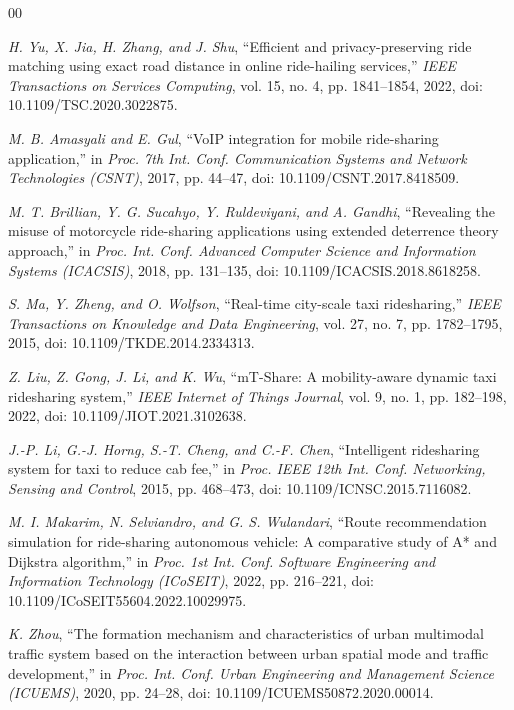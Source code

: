 \documentclass[conference]{IEEEtran}
\begin{document}
\begin{thebibliography}{00}

 \textit{H. Yu, X. Jia, H. Zhang, and J. Shu}, “Efficient and privacy-preserving ride matching using exact road distance in online ride-hailing services,” \textit{IEEE Transactions on Services Computing}, vol. 15, no. 4, pp. 1841–1854, 2022, doi: 10.1109/TSC.2020.3022875.

 \textit{M. B. Amasyali and E. Gul}, “VoIP integration for mobile ride-sharing application,” in \textit{Proc. 7th Int. Conf. Communication Systems and Network Technologies (CSNT)}, 2017, pp. 44–47, doi: 10.1109/CSNT.2017.8418509.

 \textit{M. T. Brillian, Y. G. Sucahyo, Y. Ruldeviyani, and A. Gandhi}, “Revealing the misuse of motorcycle ride-sharing applications using extended deterrence theory approach,” in \textit{Proc. Int. Conf. Advanced Computer Science and Information Systems (ICACSIS)}, 2018, pp. 131–135, doi: 10.1109/ICACSIS.2018.8618258.

 \textit{S. Ma, Y. Zheng, and O. Wolfson}, “Real-time city-scale taxi ridesharing,” \textit{IEEE Transactions on Knowledge and Data Engineering}, vol. 27, no. 7, pp. 1782–1795, 2015, doi: 10.1109/TKDE.2014.2334313.

 \textit{Z. Liu, Z. Gong, J. Li, and K. Wu}, “mT-Share: A mobility-aware dynamic taxi ridesharing system,” \textit{IEEE Internet of Things Journal}, vol. 9, no. 1, pp. 182–198, 2022, doi: 10.1109/JIOT.2021.3102638.

 \textit{J.-P. Li, G.-J. Horng, S.-T. Cheng, and C.-F. Chen}, “Intelligent ridesharing system for taxi to reduce cab fee,” in \textit{Proc. IEEE 12th Int. Conf. Networking, Sensing and Control}, 2015, pp. 468–473, doi: 10.1109/ICNSC.2015.7116082.

 \textit{M. I. Makarim, N. Selviandro, and G. S. Wulandari}, “Route recommendation simulation for ride-sharing autonomous vehicle: A comparative study of A* and Dijkstra algorithm,” in \textit{Proc. 1st Int. Conf. Software Engineering and Information Technology (ICoSEIT)}, 2022, pp. 216–221, doi: 10.1109/ICoSEIT55604.2022.10029975.

 \textit{K. Zhou}, “The formation mechanism and characteristics of urban multimodal traffic system based on the interaction between urban spatial mode and traffic development,” in \textit{Proc. Int. Conf. Urban Engineering and Management Science (ICUEMS)}, 2020, pp. 24–28, doi: 10.1109/ICUEMS50872.2020.00014.

\end{thebibliography}
\end{document}
